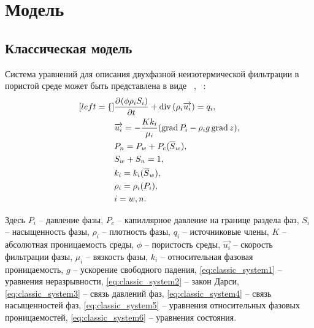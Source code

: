 \newcommand*{\pd}[3][]{\ensuremath{\dfrac{\partial^{#1} #2}{\partial #3^{#1}}}}
\newcommand*{\dd}[3][]{\ensuremath{\dfrac{\mathrm d^{#1} #2}{\mathrm d #3^{#1}}}}
\newcommand{\grad}{\mathop{\mathrm{grad}}\nolimits}
\newcommand{\diver}{\mathop{\mathrm{div}}\nolimits}

\section{Модель}
\subsection{Классическая модель}
\label{classic_model}
Система уравнений для описания двухфазной неизотермической фильтрации в пористой среде
может быть представлена в виде ~\cite{Aziz-Settari}, ~\cite{Basniev}:
\begin{subequations} \label{eq:classic_system}
  \begin{align}[left = \empheqlbrace\,]
    &\pd {(\phi \rho_i S_i)}{t} + \diver{(\rho_i \overrightarrow{u_i})} = q_i, \label{eq:classic_system1} \\
    &\overrightarrow{u_i} = -\frac{K k_i}{\mu_i}(\grad {P_i} - {\rho}_i g \grad {z}), \label{eq:classic_system2} \\
    &P_n = P_w + P_{c}(\overline{S}_w), \label{eq:classic_system3} \\
    &S_w + S_n = 1, \label{eq:classic_system4} \\
    &k_i = k_i(\overline{S}_w), \label{eq:classic_system5} \\
    &\rho_i = \rho_i(P_i), \label{eq:classic_system6} \\
    &i = w,n \nonumber .
  \end{align}
\end{subequations}

Здесь 
$P_i$ -- давление фазы,
$P_c$ -- капиллярное давление на границе раздела фаз,
$S_i$ -- насыщенность фазы,
${\rho}_i$ -- плотность фазы,
$q_i$ -- источниковые члены,
$K$ -- абсолютная проницаемость среды,
$\phi$ -- пористость среды,
$\overrightarrow{u_i}$ -- скорость фильтрации фазы,
$\mu_i$ -- вязкость фазы,
$k_i$ -- относительная фазовая проницаемость,
$g$ -- ускорение свободного падения,
\eqref{eq:classic_system1} -- уравнения неразрывности,
\eqref{eq:classic_system2} -- закон Дарси,
\eqref{eq:classic_system3} -- связь давлений фаз,
\eqref{eq:classic_system4} -- связь насыщенностей фаз,
\eqref{eq:classic_system5} -- уравнения относительных фазовых проницаемостей,
\eqref{eq:classic_system6} -- уравнения состояния.

